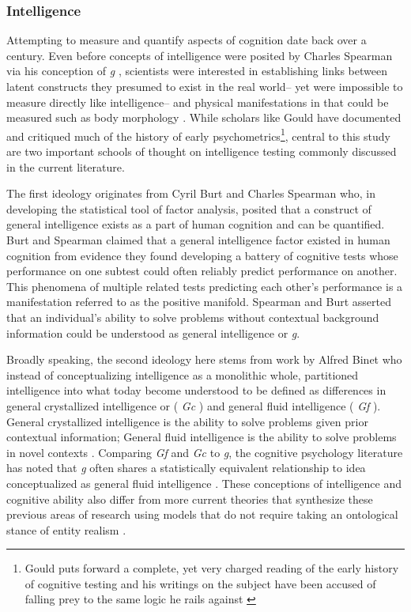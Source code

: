 \documentclass[]{book}
\let\rmarkdownfootnote\footnote%
\def\footnote{\protect\rmarkdownfootnote}
\begin{document}
\hypertarget{intelligence}{%
\subsubsection{Intelligence}\label{intelligence}}

Attempting to measure and quantify aspects of cognition date back over a century.
Even before concepts of intelligence were posited by Charles Spearman via his conception of \emph{g} \citep{spearmanGeneralIntelligenceObjectively1904}, scientists were interested in establishing links between latent constructs they presumed to exist in the real world-- yet were impossible to measure directly like intelligence-- and physical manifestations in that could be measured such as body morphology \citep{gouldMismeasureMan1996}.
While scholars like Gould have documented and critiqued much of the history of early psychometrics\footnote{Gould puts forward a complete, yet very charged reading of the early history of cognitive testing and his writings on the subject have been accused of falling prey to the same logic he rails against \citep{warneStephenJayGould2019}}, central to this study are two important schools of thought on intelligence testing commonly discussed in the current literature.

The first ideology originates from Cyril Burt and Charles Spearman who, in developing the statistical tool of factor analysis, posited that a construct of general intelligence exists as a part of human cognition and can be quantified.
Burt and Spearman claimed that a general intelligence factor existed in human cognition from evidence they found developing a battery of cognitive tests whose performance on one subtest could often reliably predict performance on another.
This phenomena of multiple related tests predicting each other's performance is a manifestation referred to as the positive manifold.
Spearman and Burt asserted that an individual's ability to solve problems without contextual background information could be understood as general intelligence or \emph{g}.

Broadly speaking, the second ideology here stems from work by Alfred Binet who instead of conceptualizing intelligence as a monolithic whole, partitioned intelligence into what today become understood to be defined as differences in general crystallized intelligence or ( \emph{Gc} ) and general fluid intelligence ( \emph{Gf} ).
General crystallized intelligence is the ability to solve problems given prior contextual information;
General fluid intelligence is the ability to solve problems in novel contexts \citep{cattellAbilitiesTheirGrowth1971, jhornTheoryFluidCrystalized1994} .
Comparing \emph{Gf} and \emph{Gc} to \emph{g}, the cognitive psychology literature has noted that \emph{g} often shares a statistically equivalent relationship to idea conceptualized as general fluid intelligence \citep{matzkeIssuePowerIdentification2010}.
These conceptions of intelligence and cognitive ability also differ from more current theories that synthesize these previous areas of research \citep{kovacsProcessOverlapTheory2016} using models that do not require taking an ontological stance of entity realism \citep{borsboomTheoreticalStatusLatent2003}.
\end{document}
